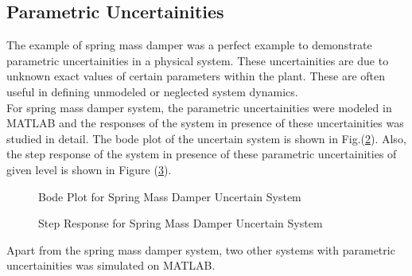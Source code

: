 \documentclass[a4paper,12pt]{article}
\begin{document}
					\begin{figure}[H]
\centering
\begin{minipage}{0.6\textwidth}
  \centering
%  
 \def\svgscale{0.5}
			  \tiny{
			  }
  \label{ti}
\end{minipage}%
\begin{minipage}{0.6\textwidth}
  \centering
%  
 \def\svgscale{0.5}
			  \tiny{
			  }
  \label{to}
\end{minipage}
\end{figure}
			\subsection{Parametric Uncertainities} The example of spring mass damper was a perfect example to demonstrate parametric uncertainities in a physical system. These uncertainities are due to unknown exact values of certain parameters within the plant. These are often useful in defining unmodeled or neglected system dynamics. \\
			For spring mass damper system, the parametric uncertainities were modeled in MATLAB and the responses of the system in presence of these uncertainities was studied in detail. The bode plot of the uncertain system is shown in Fig.(\ref{bode_smd}). Also, the step response of the system in presence of these parametric uncertainities of given level is shown in Figure (\ref{step_smd}).
			
				\begin{figure}[H]
 
			  \centering
			  
			  
			  \caption{Bode Plot for Spring Mass Damper Uncertain System}
			 \label{bode_smd}
		\end{figure}	
			
			
				\begin{figure}[H]
 
			  \centering
			  
			  
			  \caption{Step Response for Spring Mass Damper Uncertain System}
			 \label{step_smd}
		\end{figure}	
			 Apart from the spring mass damper system, two other systems with parametric uncertainities was simulated on MATLAB. 
\end{document}
